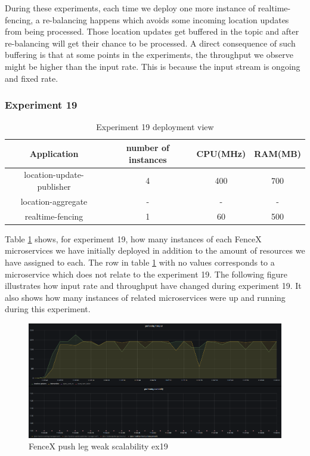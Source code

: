 \documentclass[a4]{report}
\begin{document}
    During these experiments, each time we deploy one more instance of realtime-fencing, a re-balancing happens which
    avoids some incoming location updates from being processed.
    Those location updates get buffered in the topic and after re-balancing will get their chance to be processed.
    A direct consequence of such buffering is that at some points in the experiments, the throughput we observe might be
    higher than the input rate.
    This is because the input stream is ongoing and fixed rate.

    \clearpage

    \subsubsection{Experiment 19}
    \begin{table}[h!]
        \centering
        \begin{tabular}{|c|c|c|c|}
            \hline
            Application               & number of instances & CPU(MHz) & RAM(MB) \\
            \hline
            location-update-publisher & 4                   & 400      & 700     \\
            location-aggregate        & -                   & -        & -       \\
            realtime-fencing          & 1                   & 60       & 500     \\
            \hline
        \end{tabular}
        \caption{Experiment 19 deployment view}
        \label{table:ex19-dv}
    \end{table}

    Table \ref{table:ex19-dv} shows, for experiment 19, how many instances of each FenceX microservices we have
    initially deployed in addition to the amount of resources we have assigned to each.
    The row in table \ref{table:ex19-dv} with no values corresponds to a microservice which does not relate to the
    experiment 19.
    The following figure illustrates how input rate and throughput have changed during experiment 19.
    It also shows how many instances of related microservices were up and running during this experiment.

    \begin{figure}[h!]
        \centering
        \caption{FenceX push leg weak scalability ex19}
        \label{fig:ex19}
        \includegraphics[width=\linewidth, scale=2]{images/evaluation/ex19-benchmarking-ongoing-1per16sec.png}
    \end{figure}
\end{document}
